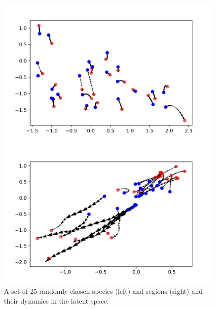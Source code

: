 \documentclass[mscthesis]{usiinfthesis}
\begin{document}
\begin{figure}[H] 
  \label{ fig7} 
  \begin{minipage}[b]{0.5\linewidth}
    \centering
    \includegraphics[width=\linewidth]{latentspace_afew_species.png} 
    \vspace{4ex}
  \end{minipage}%
  \begin{minipage}[b]{0.5\linewidth}
    \centering
    \includegraphics[width=\linewidth]{latentspace_afew_region.png} 
    \vspace{4ex}
  \end{minipage}  
\caption{A set of 25 randomly chosen species (left) and regions (right) and their dynamics in the latent space.}
\label{fig:latentspace_afew}
\end{figure}
\end{document}
